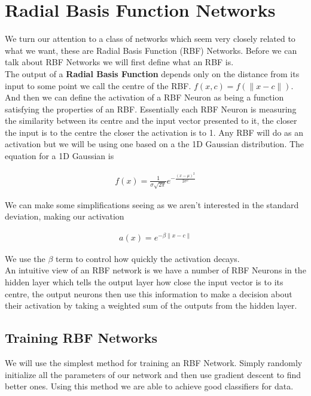 \documentclass[notitlepage]{report}
\theoremstyle{definition}
\begin{document}
\chapter{Radial Basis Function Networks}
We turn our attention to a class of networks which seem very closely related to what we want, these are Radial Basis Function (RBF) Networks. Before we can talk about RBF Networks we will first define what an RBF is.\\

The output of a \textbf{Radial Basis Function} depends only on the distance from its input to some point we call the centre of the RBF. $f(x, c) = f(\lVert x - c \lVert)$.\\

And then we can define the activation of a RBF Neuron as being a function satisfying the properties of an RBF. Essentially each RBF Neuron is measuring the similarity between its centre and the input vector presented to it, the closer the input is to the centre the closer the activation is to 1. Any RBF will do as an activation but we will be using one based on a the 1D Gaussian distribution. The equation for a 1D Gaussian is 

\begin{align*}
f(x) = \frac{1}{\sigma \sqrt{2 \pi}} e^{-\frac{(x-\mu)^2}{2\sigma^2}}
\end{align*}

We can make some simplifications seeing as we aren't interested in the standard deviation, making our activation

\begin{align}
a(x) = e^{-\beta \lVert x - c \lVert}
\end{align}

We use the $\beta$ term to control how quickly the activation decays.\\

An intuitive view of an RBF network is we have a number of RBF Neurons in the hidden layer which tells the output layer how close the input vector is to its centre, the output neurons then use this information to make a decision about their activation by taking a weighted sum of the outputs from the hidden layer.

\section{Training RBF Networks}
We will use the simplest method for training an RBF Network. Simply randomly initialize all the parameters of our network and then use gradient descent to find better ones. Using this method we are able to achieve good classifiers for data. 
\end{document}
